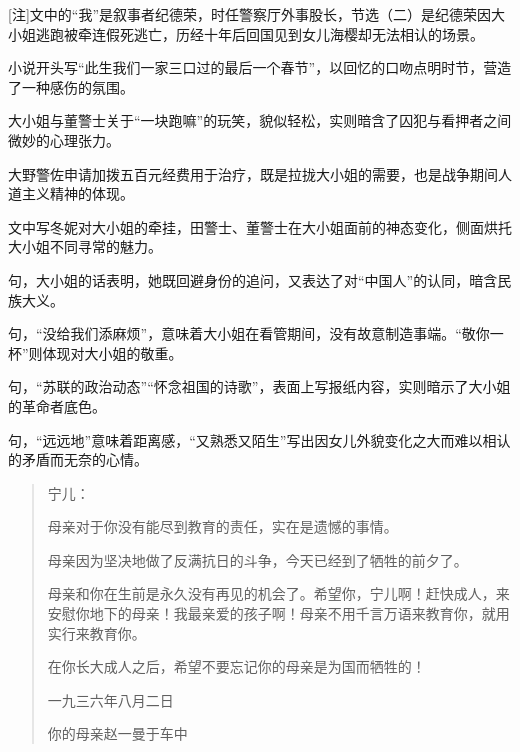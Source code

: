 \documentclass[11pt,a4paper]{ctexart}
\begin{document}
[注]文中的“我”是叙事者纪德荣，时任警察厅外事股长，节选（二）是纪德荣因大小姐逃跑被牵连假死逃亡，历经十年后回国见到女儿海樱却无法相认的场景。

\begin{choices}
\item 小说开头写“此生我们一家三口过的最后一个春节”，以回忆的口吻点明时节，营造了一种感伤的氛围。
\item 大小姐与董警士关于“一块跑嘛”的玩笑，貌似轻松，实则暗含了囚犯与看押者之间微妙的心理张力。
\item 大野警佐申请加拨五百元经费用于治疗，既是拉拢大小姐的需要，也是战争期间人道主义精神的体现。
\item 文中写冬妮对大小姐的牵挂，田警士、董警士在大小姐面前的神态变化，侧面烘托大小姐不同寻常的魅力。
\end{choices}

\begin{choices}
\item 句，大小姐的话表明，她既回避身份的追问，又表达了对“中国人”的认同，暗含民族大义。
\item 句，“没给我们添麻烦”，意味着大小姐在看管期间，没有故意制造事端。“敬你一杯”则体现对大小姐的敬重。
\item 句，“苏联的政治动态”“怀念祖国的诗歌”，表面上写报纸内容，实则暗示了大小姐的革命者底色。
\item 句，“远远地”意味着距离感，“又熟悉又陌生”写出因女儿外貌变化之大而难以相认的矛盾而无奈的心情。
\end{choices}


\par\vspace{2.2em}


\begin{quote}
宁儿：

母亲对于你没有能尽到教育的责任，实在是遗憾的事情。

母亲因为坚决地做了反满抗日的斗争，今天已经到了牺牲的前夕了。

母亲和你在生前是永久没有再见的机会了。希望你，宁儿啊！赶快成人，来安慰你地下的母亲！我最亲爱的孩子啊！母亲不用千言万语来教育你，就用实行来教育你。

在你长大成人之后，希望不要忘记你的母亲是为国而牺牲的！

\begin{flushright}一九三六年八月二日\end{flushright}
\begin{flushright}你的母亲赵一曼于车中\end{flushright}
\end{quote}
\end{document}
